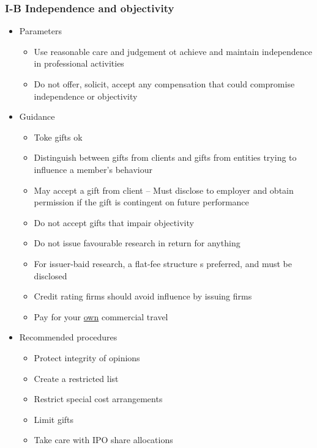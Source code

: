 \documentclass[../notes_compiled.tex]{subfiles}
\begin{document}
\subsubsection{I-B Independence and objectivity}
\begin{itemize}
\item Parameters
\begin{itemize}
\item Use reasonable care and judgement ot achieve and maintain independence in professional activities
\item Do not offer, solicit, accept any compensation that could compromise independence or objectivity
\end{itemize}
\item Guidance
\begin{itemize}
\item Toke gifts ok
\item Distinguish between gifts from clients and gifts from entities trying to influence a member’s behaviour
\item May accept a gift from client -- Must disclose to employer and obtain permission if the gift is contingent on future performance
\item Do not accept gifts that impair objectivity
\item Do not issue favourable research in return for anything
\item For issuer-baid research, a flat-fee structure s preferred, and must be disclosed
\item Credit rating firms should avoid influence by issuing firms
\item Pay for your \underline{own} commercial travel
\end{itemize}
\item Recommended procedures
\begin{itemize}
\item Protect integrity of opinions
\item Create a restricted list
\item Restrict special cost arrangements
\item Limit gifts
\item Take care with IPO share allocations
\end{itemize}
\end{itemize}
\end{document}
